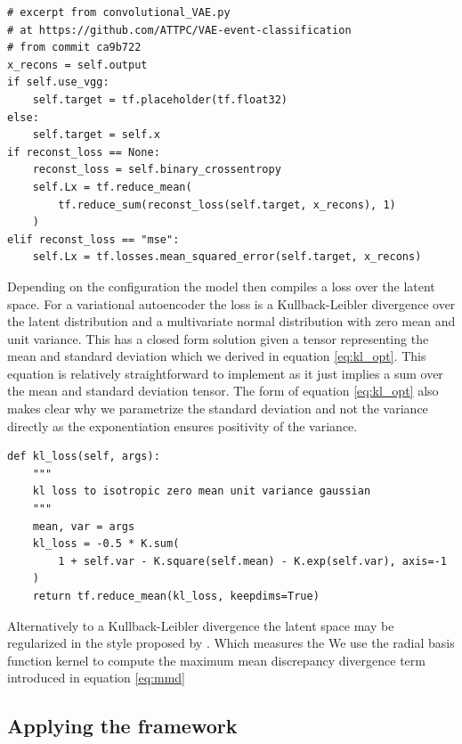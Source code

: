 \begin{minipage}{\linewidth}
\begin{lstlisting}[language=iPython]
# excerpt from convolutional_VAE.py
# at https://github.com/ATTPC/VAE-event-classification
# from commit ca9b722
x_recons = self.output
if self.use_vgg:
    self.target = tf.placeholder(tf.float32)
else:
    self.target = self.x
if reconst_loss == None:
    reconst_loss = self.binary_crossentropy
    self.Lx = tf.reduce_mean(
        tf.reduce_sum(reconst_loss(self.target, x_recons), 1)
    )
elif reconst_loss == "mse":
    self.Lx = tf.losses.mean_squared_error(self.target, x_recons)
\end{lstlisting}
\end{minipage}


Depending on the configuration the model then compiles a loss over the latent space. For a variational autoencoder the loss is a Kullback-Leibler divergence over the latent distribution and a multivariate normal distribution with zero mean and unit variance. This has a closed form solution given a tensor representing the mean and standard deviation which we derived in equation \ref{eq:kl_opt}. This equation is relatively straightforward to implement as it just implies a sum over the mean and standard deviation tensor. The form of equation \ref{eq:kl_opt} also makes clear why we parametrize the standard deviation and not the variance directly as the exponentiation ensures positivity of the variance.


\begin{minipage}{\linewidth}
\begin{lstlisting}[language=iPython]
def kl_loss(self, args):
    """
    kl loss to isotropic zero mean unit variance gaussian
    """
    mean, var = args
    kl_loss = -0.5 * K.sum(
        1 + self.var - K.square(self.mean) - K.exp(self.var), axis=-1
    )
    return tf.reduce_mean(kl_loss, keepdims=True)
\end{lstlisting}
\end{minipage}

Alternatively to a Kullback-Leibler divergence the latent space may be regularized in the style proposed by \citet{Zhao}. Which measures the  We use the radial basis function kernel to compute the maximum mean discrepancy divergence term introduced in equation \ref{eq:mmd} 

\subsection{Applying the framework}


